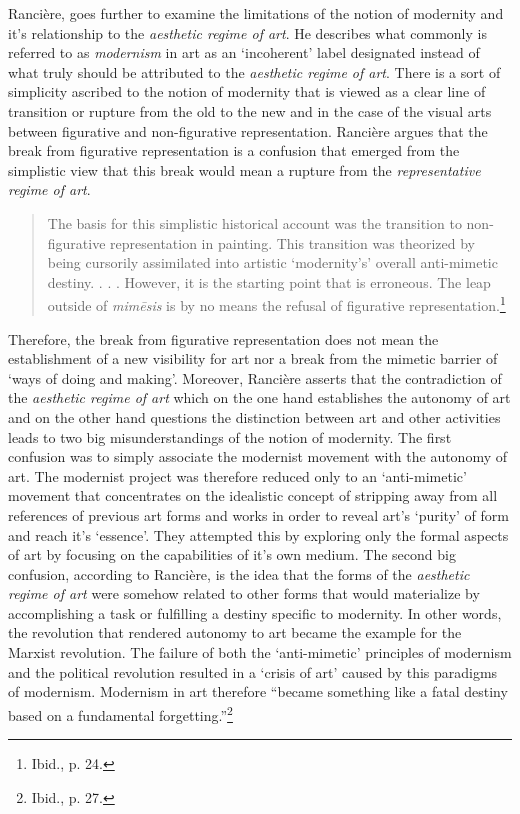 Ranci\`{e}re, goes further to examine the limitations of the notion of modernity and it's relationship to the \emph{aesthetic regime of art}. He describes what commonly is referred to as \emph{modernism} in art as an `incoherent' label designated instead of what truly should be attributed to the \emph{aesthetic regime of art}. There is a sort of simplicity ascribed to the notion of modernity that is viewed as a clear line of transition or rupture from the old to the new and in the case of the visual arts between figurative and non-figurative representation. Ranci\`{e}re argues that the break from figurative representation is a confusion that emerged from the simplistic view that this break would mean a rupture from the \emph{representative regime of art}.

\begin{quote}
The basis for this simplistic historical account was the transition to non-figurative representation in painting. This transition was theorized by being cursorily assimilated into artistic `modernity's' overall anti-mimetic destiny. . . . However, it is the starting point that is erroneous. The leap outside of \emph{mim\={e}sis} is by no means the refusal of figurative representation.\footnote{Ibid., p. 24.}
\end{quote}

Therefore, the break from figurative representation does not mean the establishment of a new visibility for art nor a break from the mimetic barrier of `ways of doing and making'. Moreover, Ranci\`{e}re asserts that the contradiction of the \emph{aesthetic regime of art} which on the one hand establishes the autonomy of art and on the other hand questions the distinction between art and other activities leads to two big misunderstandings of the notion of modernity. The first confusion was to simply associate the modernist movement with the autonomy of art. The modernist project was therefore reduced only to an `anti-mimetic' movement that concentrates on the idealistic concept of stripping away from all references of previous art forms and works in order to reveal art's `purity' of form and reach it's `essence'. They attempted this by exploring only the formal aspects of art by focusing on the capabilities of it's own medium. The second big confusion, according to Ranci\`{e}re, is the idea that the forms of the \emph{aesthetic regime of art} were somehow related to other forms that would materialize by accomplishing a task or fulfilling a destiny specific to modernity. In other words, the revolution that rendered autonomy to art became the example for the Marxist revolution. The failure of both the `anti-mimetic' principles of modernism and the political revolution resulted in a `crisis of art' caused by this paradigms of modernism. Modernism in art therefore ``became something like a fatal destiny based on a fundamental forgetting.''\footnote{Ibid., p. 27.} 

